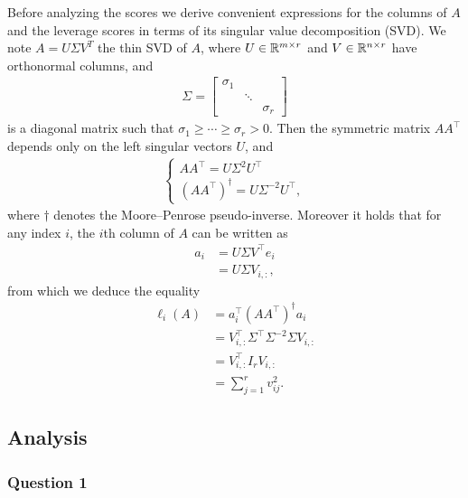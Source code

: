 \documentclass{article}
\begin{document}
Before analyzing the scores we derive convenient expressions for the columns of
$A$ and the leverage scores in terms of its singular value decomposition (SVD).
We note $A = U \Sigma V^T$ the thin SVD of $A$,
where $U \in {\mathbb R}^{m \times r}$ and $V \in {\mathbb R}^{n \times r}$ have
orthonormal columns, and
\begin{align*}
  \Sigma =
  \begin{bmatrix}
    \sigma_1 & & \\
    & \ddots & \\
    & & \sigma_r
  \end{bmatrix}
\end{align*}
is a diagonal matrix such that $\sigma_1 \geq \cdots \geq \sigma_r > 0$.
Then the symmetric matrix $A A^\top$ depends only on the left singular vectors
$U$, and
\begin{align*}
  \begin{cases}
    AA^\top = U \Sigma^2 U^\top\\
    (AA^\top)^\dagger = U \Sigma^{-2} U^\top,
  \end{cases}
\end{align*}
where $\dagger$ denotes the Moore–Penrose pseudo-inverse.
Moreover it holds that for any index $i$, the $i$th column of $A$ can be written
as
\begin{align}\label{eq:acol}
  a_i &= U \Sigma V^\top e_i\nonumber\\
      &= U \Sigma V_{i,:},
\end{align}
from which we deduce the equality
\begin{align}\label{eq:ellid}
  \ell_i(A) &= a_i^\top (A A^\top)^\dagger a_i\nonumber\\
            &= V_{i,:}^\top \Sigma^\top \Sigma^{-2} \Sigma V_{i,:}\nonumber\\
            &= V_{i,:}^\top I_r V_{i,:}\nonumber\\
            &= \sum_{j = 1}^r v_{ij}^2.
\end{align}

\subsection{Analysis}\label{subsec:analysis}

\subsubsection{Question 1}\label{subsubsec:q1}
\end{document}
